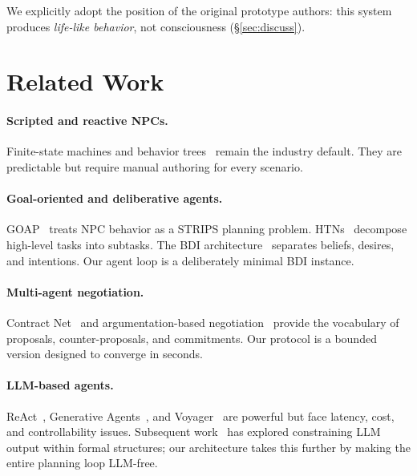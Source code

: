 \documentclass[sigconf, authorversion]{acmart}
\begin{document}
We explicitly adopt the position of the original prototype authors: this
system produces \emph{life-like behavior}, not consciousness (\S\ref{sec:discuss}).

\section{Related Work}
\label{sec:related}
\paragraph{Scripted and reactive NPCs.} Finite-state machines and
behavior trees~\cite{champandard2007behavior, dawe2008behavior} remain
the industry default. They are predictable but require manual authoring
for every scenario.

\paragraph{Goal-oriented and deliberative agents.} GOAP~\cite{orkin2006fear}
treats NPC behavior as a STRIPS planning problem. HTNs~\cite{erol1996complexity}
decompose high-level tasks into subtasks. The BDI
architecture~\cite{bratman1987intention, rao1995bdi} separates beliefs,
desires, and intentions. Our agent loop is a deliberately minimal BDI
instance.

\paragraph{Multi-agent negotiation.} Contract Net~\cite{smith1980contract}
and argumentation-based negotiation~\cite{rahwan2003argumentation} provide
the vocabulary of proposals, counter-proposals, and commitments. Our
protocol is a bounded version designed to converge in seconds.

\paragraph{LLM-based agents.} ReAct~\cite{yao2023react}, Generative
Agents~\cite{park2023generative}, and Voyager~\cite{wang2023voyager} are
powerful but face latency, cost, and controllability issues. Subsequent
work~\cite{germano2024controlling} has explored constraining LLM output
within formal structures; our architecture takes this further by making
the entire planning loop LLM-free.

\end{document}
